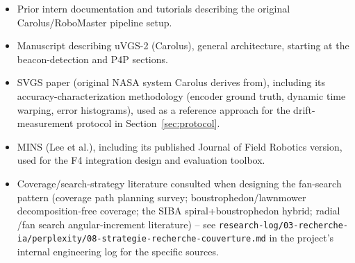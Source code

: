 \documentclass[11pt]{article}
\begin{document}
\begin{itemize}
  \item Prior intern documentation and tutorials describing the original
  Carolus/RoboMaster pipeline setup.
  \item Manuscript describing uVGS-2 (Carolus), general architecture,
  starting at the beacon-detection and P4P sections.
  \item SVGS paper (original NASA system Carolus derives from), including
  its accuracy-characterization methodology (encoder ground truth,
  dynamic time warping, error histograms), used as a reference approach for
  the drift-measurement protocol in Section~\ref{sec:protocol}.
  \item MINS (Lee et al.), including its published Journal of Field
  Robotics version, used for the F4 integration design and evaluation
  toolbox.
  \item Coverage/search-strategy literature consulted when designing the
  fan-search pattern (coverage path planning survey; boustrophedon/lawnmower
  decomposition-free coverage; the SIBA spiral+boustrophedon hybrid; radial
  /fan search angular-increment literature) -- see
  \texttt{research-log/03-recherche-ia/perplexity/08-strategie-recherche-couverture.md}
  in the project's internal engineering log for the specific sources.
\end{itemize}
\end{document}
